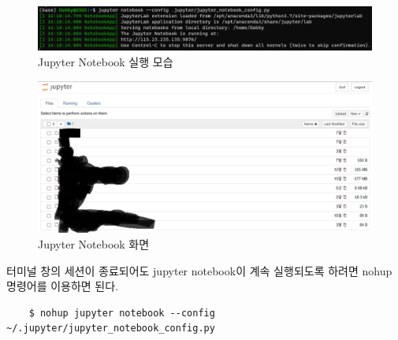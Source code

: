 \begin{figure}[H]
	\begin{center}
        \includegraphics[width=0.6\linewidth]{jupyter_notebook_running}
        \caption{Jupyter Notebook 실행 모습}
    \end{center}
\end{figure}

\begin{figure}[H]
	\begin{center}
        \includegraphics[width=0.8\linewidth]{jupyter_notebook_display}
        \caption{Jupyter Notebook 화면}
    \end{center}
\end{figure}

터미널 창의 세션이 종료되어도 jupyter notebook이 계속 실행되도록 하려면 nohup 명령어를 이용하면 된다.
\begin{lstlisting}
    $ nohup jupyter notebook --config ~/.jupyter/jupyter_notebook_config.py
\end{lstlisting}

